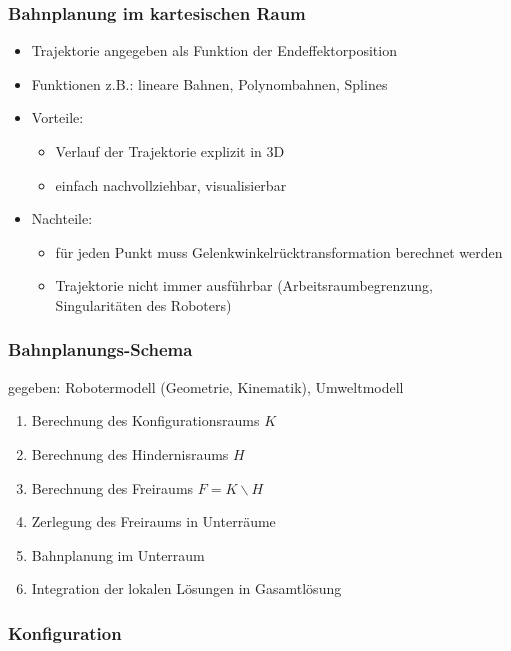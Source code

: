 \subsubsection*{Bahnplanung im kartesischen Raum}

\begin{itemize}
\item Trajektorie angegeben als Funktion der Endeffektorposition
\item Funktionen z.B.: lineare Bahnen, Polynombahnen, Splines
\item Vorteile:
\begin{itemize}
\item Verlauf der Trajektorie explizit in 3D
\item einfach nachvollziehbar, visualisierbar
\end{itemize}
\item Nachteile:
\begin{itemize}
\item für jeden Punkt muss Gelenkwinkelrücktransformation berechnet werden
\item Trajektorie nicht immer ausführbar (Arbeitsraumbegrenzung, Singularitäten des Roboters)
\end{itemize}
\end{itemize}

\subsubsection*{Bahnplanungs-Schema}

gegeben: Robotermodell (Geometrie, Kinematik), Umweltmodell

\begin{enumerate}
\item Berechnung des Konfigurationsraums $K$
\item Berechnung des Hindernisraums $H$
\item Berechnung des Freiraums $F = K \backslash H$
\item Zerlegung des Freiraums in Unterräume
\item Bahnplanung im Unterraum
\item Integration der lokalen Lösungen in Gasamtlösung
\end{enumerate}

\subsubsection*{Konfiguration}

